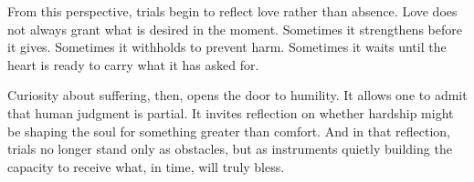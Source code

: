 \documentclass[12pt]{article}
\begin{document}
From this perspective, trials begin to reflect love rather than absence. Love
does not always grant what is desired in the moment. Sometimes it strengthens
before it gives. Sometimes it withholds to prevent harm. Sometimes it waits
until the heart is ready to carry what it has asked for.

Curiosity about suffering, then, opens the door to humility. It allows one to
admit that human judgment is partial. It invites reflection on whether hardship
might be shaping the soul for something greater than comfort. And in that
reflection, trials no longer stand only as obstacles, but as instruments quietly
building the capacity to receive what, in time, will truly bless.
\end{document}
